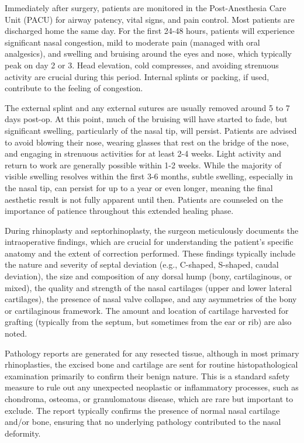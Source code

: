 Immediately after surgery, patients are monitored in the Post-Anesthesia Care Unit (PACU) for airway patency, vital signs, and pain control. Most patients are discharged home the same day. For the first 24-48 hours, patients will experience significant nasal congestion, mild to moderate pain (managed with oral analgesics), and swelling and bruising around the eyes and nose, which typically peak on day 2 or 3. Head elevation, cold compresses, and avoiding strenuous activity are crucial during this period. Internal splints or packing, if used, contribute to the feeling of congestion.

The external splint and any external sutures are usually removed around 5 to 7 days post-op. At this point, much of the bruising will have started to fade, but significant swelling, particularly of the nasal tip, will persist. Patients are advised to avoid blowing their nose, wearing glasses that rest on the bridge of the nose, and engaging in strenuous activities for at least 2-4 weeks. Light activity and return to work are generally possible within 1-2 weeks. While the majority of visible swelling resolves within the first 3-6 months, subtle swelling, especially in the nasal tip, can persist for up to a year or even longer, meaning the final aesthetic result is not fully apparent until then. Patients are counseled on the importance of patience throughout this extended healing phase.

During rhinoplasty and septorhinoplasty, the surgeon meticulously documents the intraoperative findings, which are crucial for understanding the patient's specific anatomy and the extent of correction performed. These findings typically include the nature and severity of septal deviation (e.g., C-shaped, S-shaped, caudal deviation), the size and composition of any dorsal hump (bony, cartilaginous, or mixed), the quality and strength of the nasal cartilages (upper and lower lateral cartilages), the presence of nasal valve collapse, and any asymmetries of the bony or cartilaginous framework. The amount and location of cartilage harvested for grafting (typically from the septum, but sometimes from the ear or rib) are also noted.

Pathology reports are generated for any resected tissue, although in most primary rhinoplasties, the excised bone and cartilage are sent for routine histopathological examination primarily to confirm their benign nature. This is a standard safety measure to rule out any unexpected neoplastic or inflammatory processes, such as chondroma, osteoma, or granulomatous disease, which are rare but important to exclude. The report typically confirms the presence of normal nasal cartilage and/or bone, ensuring that no underlying pathology contributed to the nasal deformity.

